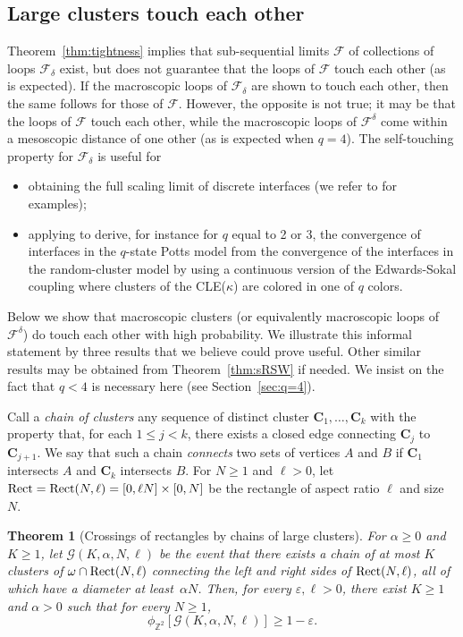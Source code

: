\documentclass[a4paper,oneside,11pt]{article}
\newtheorem{theorem}{Theorem}[section]
\numberwithin{equation}{section}
\numberwithin{equation}{section}
\numberwithin{equation}{section}
\newcommand{\calF}{\mathcal{F}}
\newcommand{\calG}{\mathcal{G}}
\newcommand{\bbZ}{\mathbb{Z}}
\newcommand{\bfC}{\mathbf C}
\newcommand{\ep}{\varepsilon}
\newcommand{\eps}{\varepsilon}
\renewcommand{\ep}{\varepsilon}
\begin{document}
 
 \subsection{Large clusters touch each other}

Theorem~\ref{thm:tightness} implies that sub-sequential limits $\calF$ of collections of loops $\calF_\delta$ exist, 
but does not guarantee that the loops of $\calF$ touch each other (as is expected).
If the macroscopic loops of $\calF_\delta$ are shown to touch each other, then the same follows for those of $\calF$. 
However, the opposite is not true; it may be that the loops of $\calF$ touch each other, 
while the macroscopic loops of $\calF^\delta$ come within a mesoscopic distance of one other (as is expected when $q = 4$). 
The self-touching property for $\calF_\delta$ is useful for
\begin{itemize}
\item obtaining the full scaling limit of discrete interfaces (we refer to \cite{AizBur99,KemSmi16} for examples);
\item applying \cite{MilSheWer17} to derive, for instance for $q$ equal to 2 or 3, the convergence of interfaces in the $q$-state Potts model from the convergence of the interfaces in the random-cluster model by using a continuous version of the Edwards-Sokal coupling where clusters of the CLE($\kappa$) are colored in one of $q$ colors.
\end{itemize}


Below we show that macroscopic clusters (or equivalently macroscopic loops of $\calF^\delta$) do touch each other with high probability.
We illustrate this informal statement by three results that we believe could prove useful.
Other similar results may be obtained from Theorem~\ref{thm:sRSW} if needed. 
We insist on the fact that $q < 4$ is necessary here (see Section~\ref{sec:q=4}). 

Call a {\em chain of clusters} any sequence of distinct cluster $\mathbf C_1,\dots, \mathbf C_k$ 
with the property that, for each $1\leq j < k$, there exists a closed edge connecting $\bfC_j$ to $\bfC_{j+1}$. 
We say that such a chain {\em connects} two sets of vertices $A$ and $B$ if $\bfC_1$ intersects $A$ and $\bfC_k$ intersects $B$. 
\newcommand{\Rect}{{\rm Rect}}
For $N \geq 1$ and $\ell >0$, let $\Rect = \Rect(N,\ell) = [0,\ell N] \times [0,N]$ be the rectangle of aspect ratio $\ell$ and size $N$. 
	
	
\begin{theorem}[Crossings of rectangles by chains of large clusters]\label{thm:self-touching}
	For $\alpha \geq 0 $ and $K\geq 1$, let $\calG(K,\alpha,N,\ell)$ be the event 
	that there exists a chain of at most $K$ clusters of $\omega \cap \Rect(N,\ell)$ 
	connecting the left and right sides of $\Rect(N,\ell)$, all of which have a diameter at least~$\alpha N$. 
	Then, for every $\ep,\ell > 0$, there exist $K \geq 1$ and $\alpha >0$ such that for every $N\ge1$,
	$$ \phi_{\bbZ^2}[\calG(K,\alpha,N,\ell)] \geq 1 - \eps.$$ 
\end{theorem}
\end{document}

